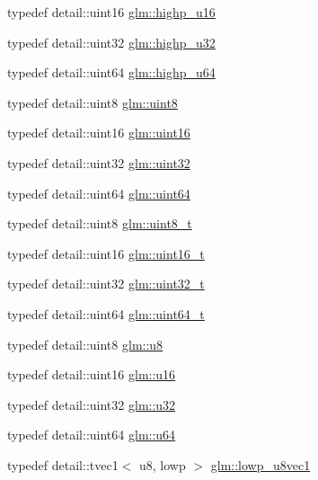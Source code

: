 \begin{DoxyCompactItemize}
\item 
typedef detail\+::uint16 \hyperlink{group__gtc__type__precision_ga9da2178d7501d9c0f225fa1a7b70cb45}{glm\+::highp\+\_\+u16}
\item 
typedef detail\+::uint32 \hyperlink{group__gtc__type__precision_gae8e8a2c712653891a03c171795286ac5}{glm\+::highp\+\_\+u32}
\item 
typedef detail\+::uint64 \hyperlink{group__gtc__type__precision_ga6006ea883d3c0491791650b2fb84de39}{glm\+::highp\+\_\+u64}
\item 
typedef detail\+::uint8 \hyperlink{group__gtc__type__precision_ga1a7dcd8aac97cc8020817c94049deff2}{glm\+::uint8}
\item 
typedef detail\+::uint16 \hyperlink{group__gtc__type__precision_gad8c2939e1fdd8e5828b31d95c52255d5}{glm\+::uint16}
\item 
typedef detail\+::uint32 \hyperlink{group__gtc__type__precision_ga202b6a53c105fcb7e531f9b443518451}{glm\+::uint32}
\item 
typedef detail\+::uint64 \hyperlink{group__gtc__type__precision_gae3632bf9b37da66233d78930dd06378a}{glm\+::uint64}
\item 
typedef detail\+::uint8 \hyperlink{group__gtc__type__precision_ga93adf6dd9803408f3e3aaf9dedda352b}{glm\+::uint8\+\_\+t}
\item 
typedef detail\+::uint16 \hyperlink{group__gtc__type__precision_gac4eb4f43cae8129b00086dc234d3b8fc}{glm\+::uint16\+\_\+t}
\item 
typedef detail\+::uint32 \hyperlink{group__gtc__type__precision_ga822ca53a9ad412504532838906276a99}{glm\+::uint32\+\_\+t}
\item 
typedef detail\+::uint64 \hyperlink{group__gtc__type__precision_ga058f57c19e1befdcf12498944bd73e69}{glm\+::uint64\+\_\+t}
\item 
typedef detail\+::uint8 \hyperlink{group__gtc__type__precision_ga5e3dc67373d5068997d2d9f41c9024d2}{glm\+::u8}
\item 
typedef detail\+::uint16 \hyperlink{group__gtc__type__precision_gae7a1571503f83d2264ddfa705a6b082a}{glm\+::u16}
\item 
typedef detail\+::uint32 \hyperlink{group__gtc__type__precision_ga54e837745059fd29017bed71cfa0a8db}{glm\+::u32}
\item 
typedef detail\+::uint64 \hyperlink{group__gtc__type__precision_ga71cedd4972f9cb1a5e14dfe5ab83ecd7}{glm\+::u64}
\item 
typedef detail\+::tvec1$<$ u8, lowp $>$ \hyperlink{group__gtc__type__precision_gaee3cba2c93fa8cb7295671908995197c}{glm\+::lowp\+\_\+u8vec1}

\end{DoxyCompactItemize}
